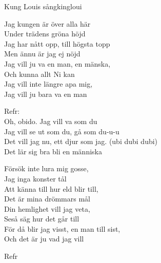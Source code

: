 \begin{song}{Kung Louis sång}{kingloui}
\begin{vers}
Jag kungen är över alla här\\
Under trädens gröna höjd\\
Jag har nått opp, till högsta topp\\
Men ännu är jag ej nöjd\\
Jag vill ju va en man, en mänska, \\
Och kunna allt Ni kan\\
Jag vill inte längre apa mig, \\
Jag vill ju bara va en man\\
\end{vers}
\begin{vers}
Refr:\\
Oh, obido. Jag vill va som du\\
Jag vill se ut som du, gå som du-u-u\\
Det vill jag nu, ett djur som jag. (ubi dubi dubi)\\
Det lär sig bra bli en människa\\
\end{vers}
\begin{vers}
Försök inte lura mig gosse, \\
Jag inga konster tål\\
Att känna till hur eld blir till, \\
Det är mina drömmars mål\\
Din hemlighet vill jag veta, \\
Seså säg hur det går till\\
För då blir jag visst, en man till sist, \\
Och det är ju vad jag vill\\
\end{vers}
\begin{vers}
Refr\\
\end{vers}
\end{song}
